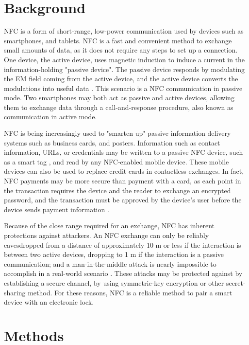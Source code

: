 \documentclass{article}
\begin{document}
\section{Background}

NFC is a form of short-range, low-power communication used by devices such as smartphones, and tablets. NFC is a fast and convenient method to exchange small amounts of data, as it does not require any steps to set up a connection. One device, the active device, uses magnetic induction to induce a current in the information-holding "passive device". The passive device responds by modulating the EM field coming from the active device, and the active device converts the modulations into useful data \autocite{NFCORG}. This scenario is a NFC communication in passive mode. Two smartphones may both act as passive and active devices, allowing them to exchange data through a call-and-response procedure, also known as communication in active mode.

NFC is being increasingly used to "smarten up" passive information delivery systems such as business cards, and posters. Information such as contact information, URLs, or credentials may be written to a passive NFC device, such as a smart tag \autocite{NFCFORUMWHATIS}, and read by any NFC-enabled mobile device. These mobile devices can also be used to replace credit cards in contactless exchanges. In fact, NFC payments may be more secure than payment with a card, as each point in the transaction requires the device and the reader to exchange an encrypted password, and the transaction must be approved by the device's user before the device sends payment information \autocite{NFCPAYMENT}.

Because of the close range required for an exchange, NFC has inherent protections against attackers. An NFC exchange can only be reliably eavesdropped from a distance of approximately 10 m or less if the interaction is between two active devices, dropping to 1 m if the interaction is a passive communication; and a man-in-the-middle attack is nearly impossible to accomplish in a real-world scenario \autocite{NFCSECURITY}. These attacks may be protected against by establishing a secure channel, by using symmetric-key encryption or other secret-sharing method. For these reasons, NFC is a reliable method to pair a smart device with an electronic lock.

\section{Methods}
\end{document}
